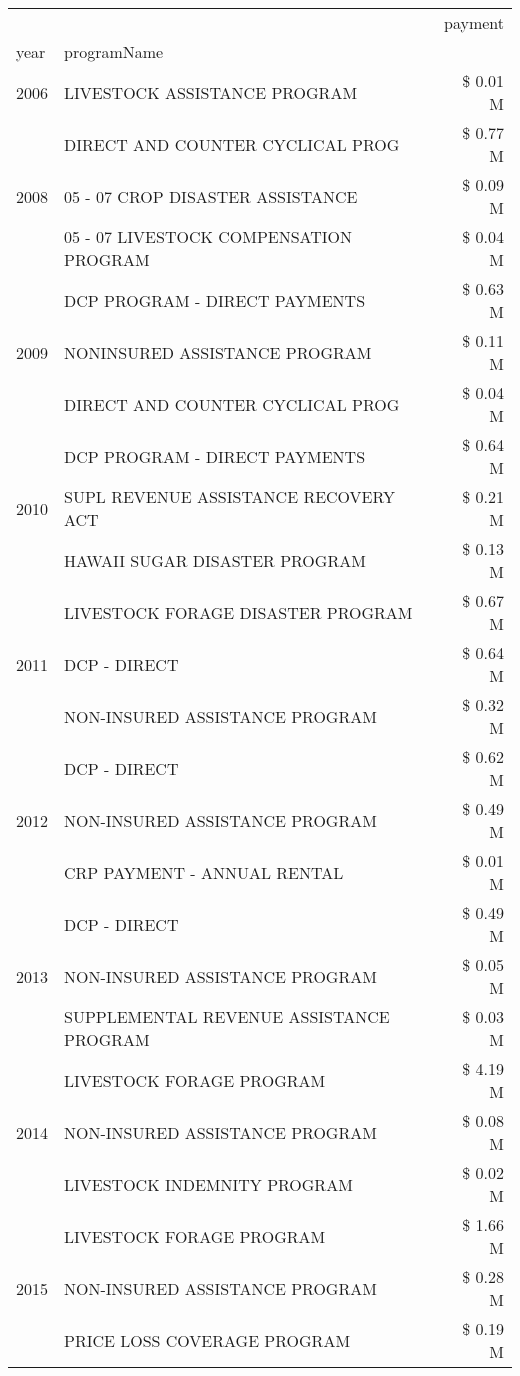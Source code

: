 \begin{tabular}{llr}
\toprule
 &  & payment \\
year & programName &  \\
\midrule
2006 & LIVESTOCK ASSISTANCE PROGRAM & \$ 0.01 M \\
\cline{1-3}
\multirow[t]{3}{*}{2008} & DIRECT AND COUNTER CYCLICAL PROG & \$ 0.77 M \\
 & 05 - 07 CROP DISASTER ASSISTANCE & \$ 0.09 M \\
 & 05 - 07 LIVESTOCK COMPENSATION PROGRAM & \$ 0.04 M \\
\cline{1-3}
\multirow[t]{3}{*}{2009} & DCP PROGRAM - DIRECT PAYMENTS & \$ 0.63 M \\
 & NONINSURED ASSISTANCE PROGRAM & \$ 0.11 M \\
 & DIRECT AND COUNTER CYCLICAL PROG & \$ 0.04 M \\
\cline{1-3}
\multirow[t]{3}{*}{2010} & DCP PROGRAM - DIRECT PAYMENTS & \$ 0.64 M \\
 & SUPL REVENUE ASSISTANCE RECOVERY ACT & \$ 0.21 M \\
 & HAWAII SUGAR DISASTER PROGRAM & \$ 0.13 M \\
\cline{1-3}
\multirow[t]{3}{*}{2011} & LIVESTOCK FORAGE DISASTER PROGRAM & \$ 0.67 M \\
 & DCP - DIRECT & \$ 0.64 M \\
 & NON-INSURED ASSISTANCE PROGRAM & \$ 0.32 M \\
\cline{1-3}
\multirow[t]{3}{*}{2012} & DCP - DIRECT & \$ 0.62 M \\
 & NON-INSURED ASSISTANCE PROGRAM & \$ 0.49 M \\
 & CRP PAYMENT - ANNUAL RENTAL & \$ 0.01 M \\
\cline{1-3}
\multirow[t]{3}{*}{2013} & DCP - DIRECT & \$ 0.49 M \\
 & NON-INSURED ASSISTANCE PROGRAM & \$ 0.05 M \\
 & SUPPLEMENTAL REVENUE ASSISTANCE PROGRAM & \$ 0.03 M \\
\cline{1-3}
\multirow[t]{3}{*}{2014} & LIVESTOCK FORAGE PROGRAM & \$ 4.19 M \\
 & NON-INSURED ASSISTANCE PROGRAM & \$ 0.08 M \\
 & LIVESTOCK INDEMNITY PROGRAM & \$ 0.02 M \\
\cline{1-3}
\multirow[t]{3}{*}{2015} & LIVESTOCK FORAGE PROGRAM & \$ 1.66 M \\
 & NON-INSURED ASSISTANCE PROGRAM & \$ 0.28 M \\
 & PRICE LOSS COVERAGE PROGRAM & \$ 0.19 M \\

\end{tabular}
